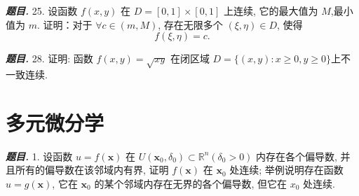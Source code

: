 \documentclass[10pt, a4paper, oneside]{ctexart}
\newenvironment{problem}{\begin{framed}\par\noindent\textbf{\textit{题目. }}}{\end{framed}\par}
\begin{document}
\begin{problem}
    25. 设函数 $f(x, y)$ 在 $D=[0,1] \times[0,1]$ 上连续, 它的最大值为 $M$,最小值为 $m$. 证明：对于 $\forall c \in(m, M)$, 存在无限多个 $(\xi, \eta) \in D$, 使得
    $$
    f(\xi, \eta)=c .
    $$
\end{problem}

\begin{problem}
    28. 证明: 函数 $f(x, y)=\sqrt{x y}$ 在闭区域 $D=\{(x, y): x \geqslant 0, y \geqslant 0\}$上不一致连续.
\end{problem}

\section{多元微分学}

\begin{problem}
1. 设函数 $u=f(\boldsymbol{x})$ 在 $U\left(\boldsymbol{x}_0, \delta_0\right) \subset \mathbb{R}^n\left(\delta_0>0\right)$ 内存在各个偏导数, 并且所有的偏导数在该邻域内有界, 证明 $f(\boldsymbol{x})$ 在 $\boldsymbol{x}_0$ 处连续; 举例说明存在函数 $u=g(\boldsymbol{x})$, 它在 $\boldsymbol{x}_0$ 的某个邻域内存在无界的各个偏导数, 但它在 $x_0$ 处连续.
\end{problem}
\end{document}

